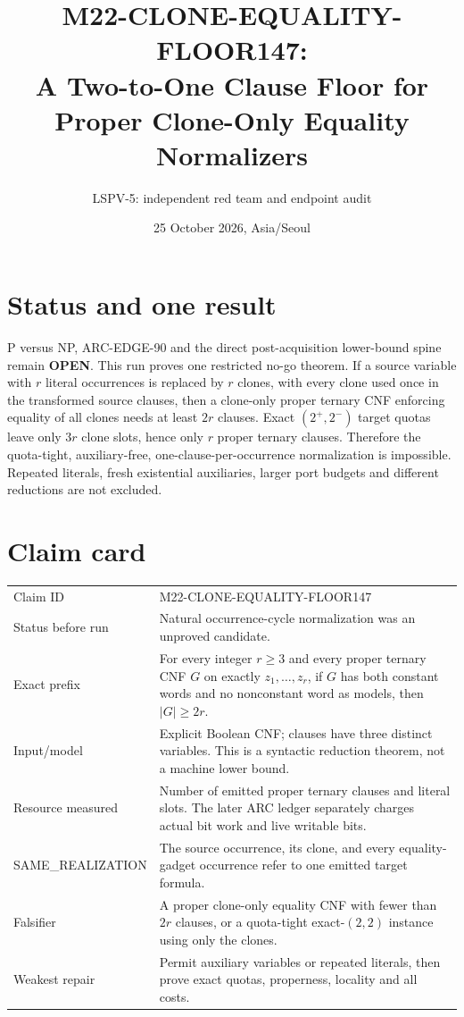 \documentclass[11pt]{article}
\title{M22-CLONE-EQUALITY-FLOOR147:\\A Two-to-One Clause Floor for Proper Clone-Only Equality Normalizers}
\author{LSPV-5: independent red team and endpoint audit}
\date{25 October 2026, Asia/Seoul}
\newcommand{\OPEN}{\textbf{OPEN}}
\begin{document}
\maketitle

\section*{Status and one result}

P versus NP, ARC-EDGE-90 and the direct post-acquisition lower-bound spine
remain \OPEN.  This run proves one restricted no-go theorem.  If a source
variable with $r$ literal occurrences is replaced by $r$ clones, with every
clone used once in the transformed source clauses, then a clone-only proper
ternary CNF enforcing equality of all clones needs at least $2r$ clauses.
Exact $(2^+,2^-)$ target quotas leave only $3r$ clone slots, hence only $r$
proper ternary clauses.  Therefore the quota-tight, auxiliary-free,
one-clause-per-occurrence normalization is impossible.  Repeated literals,
fresh existential auxiliaries, larger port budgets and different reductions
are not excluded.

\section{Claim card}

\begin{center}
\begin{tabular}{>{\raggedright\arraybackslash}p{.25\linewidth}p{.68\linewidth}}
\toprule
Claim ID & M22-CLONE-EQUALITY-FLOOR147\\
Status before run & Natural occurrence-cycle normalization was an unproved candidate.\\
Exact prefix & For every integer $r\ge3$ and every proper ternary CNF $G$ on exactly $z_1,\ldots,z_r$, if $G$ has both constant words and no nonconstant word as models, then $|G|\ge2r$.\\
Input/model & Explicit Boolean CNF; clauses have three distinct variables.  This is a syntactic reduction theorem, not a machine lower bound.\\
Resource measured & Number of emitted proper ternary clauses and literal slots.  The later ARC ledger separately charges actual bit work and live writable bits.\\
SAME\_REALIZATION & The source occurrence, its clone, and every equality-gadget occurrence refer to one emitted target formula.\\
Falsifier & A proper clone-only equality CNF with fewer than $2r$ clauses, or a quota-tight exact-$(2,2)$ instance using only the clones.\\
Weakest repair & Permit auxiliary variables or repeated literals, then prove exact quotas, properness, locality and all costs.\\
\bottomrule
\end{tabular}
\end{center}
\end{document}
